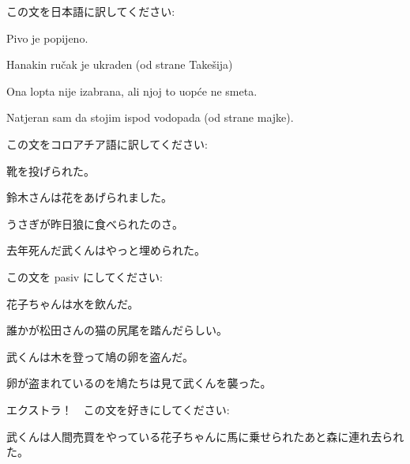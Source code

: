 
\author{Katja Kržišnik}

	
	\begin{mondai}{この文を日本語に訳してください:}
		\item Pivo je popijeno.
		\item Hanakin ručak je ukraden (od strane Takešija)
		\item Ona lopta nije izabrana, ali njoj to uopće ne smeta.
		\item Natjeran sam da stojim ispod vodopada (od strane majke). 
	\end{mondai}
	
	\begin{mondai}{この文をコロアチア語に訳してください:}
		\item 靴を投げられた。 
		\item 鈴木さんは花をあげられました。
		\item うさぎが昨日狼に食べられたのさ。
		\item 去年死んだ武くんはやっと埋められた。
	\end{mondai}
	
	\begin{mondai}{この文を pasiv にしてください:}
		\item 花子ちゃんは水を飲んだ。
		\item 誰かが松田さんの猫の尻尾を踏んだらしい。
		\item 武くんは木を登って鳩の卵を盗んだ。
		\item 卵が盗まれているのを鳩たちは見て武くんを襲った。
	\end{mondai}
	
	\begin{mondai}{ エクストラ！　この文を好きにしてください: }
		\item 武くんは人間売買をやっている花子ちゃんに馬に乗せられたあと森に連れ去られた。  
	\end{mondai}
